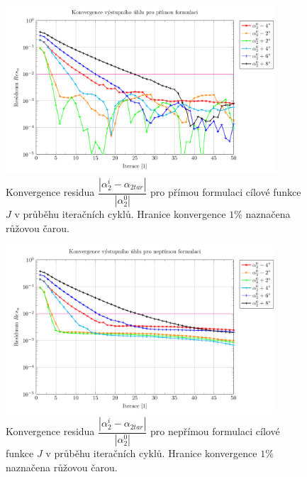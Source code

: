 \begin{figure}
	\includegraphics[width=0.9\textwidth]{img/UyA.pdf}
	\caption{Konvergence residua $ \dfrac{|\alpha_{2}^i-\alpha_{2tar}|}{|\alpha_{2}^0|} $ pro přímou formulaci cílové funkce $ J $ v průběhu iteračních cyklů. Hranice konvergence $ 1\% $ naznačena růžovou čarou.}
	\label{fig:ghs1_UyA}
\end{figure}

\begin{figure}
	\includegraphics[width=0.9\textwidth]{img/FyA.pdf}
	\caption{Konvergence residua $ \dfrac{|\alpha_{2}^i-\alpha_{2tar}|}{|\alpha_{2}^0|} $ pro nepřímou formulaci cílové funkce $ J $ v průběhu iteračních cyklů. Hranice konvergence $ 1\% $ naznačena růžovou čarou.}
	\label{fig:ghs1_FyA}
\end{figure}

